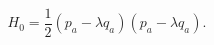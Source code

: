 \begin{equation}
H_{0}=\frac{1}{2}(p_{a}-\lambda q_{a})(p_{a}-\lambda q_{a}).
\label{canH}
\end{equation}

